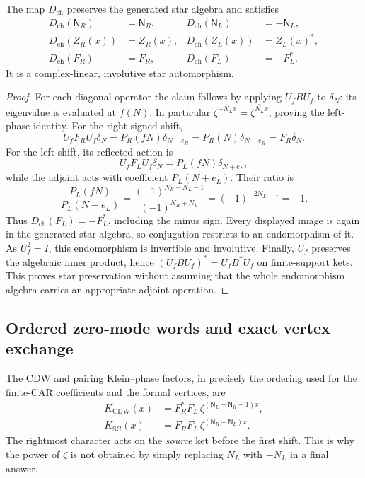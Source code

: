 \begin{lemma}
\label{lem:ch20c-charge}
The map $D_{\mathrm{ch}}$ preserves the generated star algebra and
satisfies
\begin{align}
 D_{\mathrm{ch}}(\mathsf N_R)&=\mathsf N_R,&
 D_{\mathrm{ch}}(\mathsf N_L)&=-\mathsf N_L,\nonumber\\
 D_{\mathrm{ch}}(Z_R(x))&=Z_R(x),&
 D_{\mathrm{ch}}(Z_L(x))&=Z_L(x)^*,\nonumber\\
 D_{\mathrm{ch}}(F_R)&=F_R,&
 D_{\mathrm{ch}}(F_L)&=-F_L^*.
 \label{eq:ch20c-charge-images}
\end{align}
It is a complex-linear, involutive star automorphism.
\end{lemma}
\begin{proof}
For each diagonal operator the claim follows by applying
$U_fBU_f$ to $\delta_N$: its eigenvalue is evaluated at $f(N)$.
In particular $\zeta^{-N_Lx}=\overline{\zeta^{N_Lx}}$, proving
the left-phase identity.  For the right signed shift,
\[
 U_fF_RU_f\delta_N=P_R(fN)\delta_{N-e_R}
 =P_R(N)\delta_{N-e_R}=F_R\delta_N.
\]
For the left shift, its reflected action is
\[
 U_fF_LU_f\delta_N
  =P_L(fN)\delta_{N+e_L},
\]
while the adjoint acts with coefficient $P_L(N+e_L)$.  Their ratio is
\[
 \frac{P_L(fN)}{P_L(N+e_L)}
 =\frac{(-1)^{N_R-N_L-1}}{(-1)^{N_R+N_L}}
 =(-1)^{-2N_L-1}=-1.
\]
Thus $D_{\mathrm{ch}}(F_L)=-F_L^*$, including the minus sign.
Every displayed image is again in the generated star algebra,
so conjugation restricts to an endomorphism of it.  As $U_f^2=I$,
this endomorphism is invertible and involutive.  Finally,
$U_f$ preserves the algebraic inner product, hence
$(U_fBU_f)^*=U_fB^*U_f$ on finite-support kets.  This proves
star preservation without assuming that the whole endomorphism
algebra carries an appropriate adjoint operation.
\end{proof}

\subsection{Ordered zero-mode words and exact vertex exchange}
\label{subsec:ch20c-vertices}

The CDW and pairing Klein--phase factors, in precisely the ordering
used for the finite-CAR coefficients and the formal vertices, are
\begin{align}
 K_{\mathrm{CDW}}(x)
 &=F_R^*F_L\,\zeta^{(\mathsf N_L-\mathsf N_R-1)x},
 \label{eq:ch20c-Kcdw}\\
 K_{\mathrm{SC}}(x)
 &=F_RF_L\,\zeta^{(\mathsf N_R+\mathsf N_L)x}.
 \label{eq:ch20c-Ksc}
\end{align}
The rightmost character acts on the \emph{source} ket before the
first shift.  This is why the power of $\zeta$ is not obtained by
simply replacing $N_L$ with $-N_L$ in a final answer.

